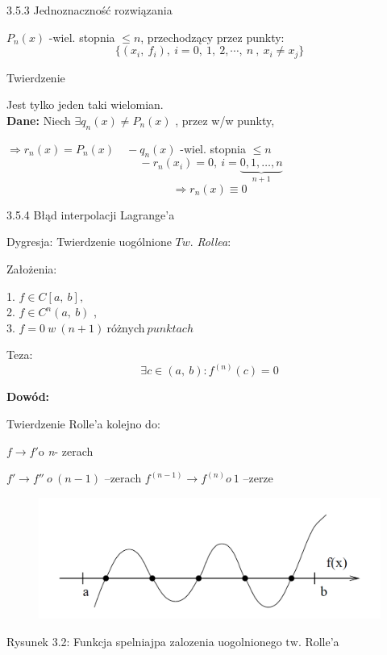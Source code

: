 \begin{frame}{3.5.3 Jednoznaczność rozwiązania}

$P_{n}(x)$ -wiel. stopnia $\leq n$, przechodzący przez punkty:
$$
\{(x_{i},\ f_{i}),\ i=0,\ 1,\ 2,\cdots ,\ n\ ,\ x_{i}\neq x_{j}\}
$$

\begin{block}{Twierdzenie}

Jest tylko jeden taki wielomian.\\
\vspace{2mm}
\textbf{Dane:} Niech $\exists q_{n}(x)\neq P_{n}(x)$ , przez w/w punkty,

$\Rightarrow r_{n}(x)=P_{n}(x) \quad -q_{n}(x)$ -wiel. stopnia $\leq n$
$$
 \: -r_{n}(x_{i})=0,\ i=\underbrace{0,1, \dots, n}_{n+1}
$$
$$
\Rightarrow r_{n}(x)\equiv 0
$$
\end{block}
\end{frame}

\begin{frame}{3.5.4 Błąd interpolacji Lagrange'a}

\begin{block}
{Dygresja: Twierdzenie uogólnione $Tw$. {\it Rollea}:}

Założenia:
\begin{center}
1. $f\in C[a,\ b],$ \\
2. $f\in C^{n}(a,\ b)$ , \\
3. $f=0\: w\: (n+1)\: $różnych$ \:punktach$
\end{center}


Teza:
$$
\exists c\in(a,\ b):f^{(n)}(c)=0
$$
\end{block}
\textbf{Dowód:}

Twierdzenie Rolle'a kolejno do:

$f \rightarrow f'\mathrm{o}$ {\it n}- zerach

$f' \rightarrow f'' \:o\:(n-1)$ --zerach \newline
$f^{(n-1)} \rightarrow f^{(n)} o\: 1$ \: --zerze
 \end{frame}
 
 \begin{frame}
 \begin{figure}[h]
			\includegraphics[width=1 \linewidth]{img/3/interpol_3_5}
	\end{figure}
Rysunek 3.2: Funkcja spelniajpa zalozenia uogolnionego $\mathrm{t}\mathrm{w}$. Rolle'a 
 \end{frame}
 
